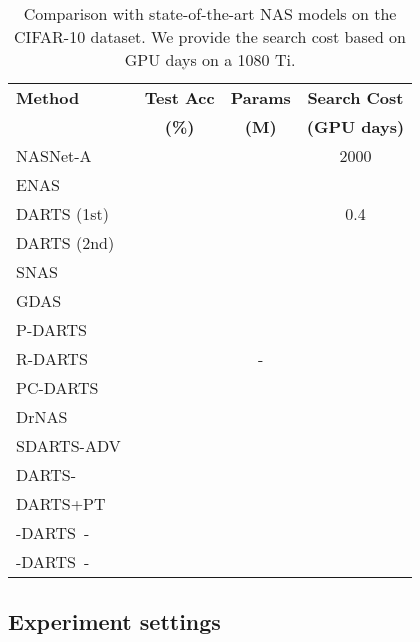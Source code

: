\documentclass{article} \usepackage{fancyhdr, iclr2023_conference, times}
\newcommand{\mydarts}{-DARTS\xspace}
\begin{document}
\begin{table}[t!]
\centering
\caption{Comparison with state-of-the-art NAS models on the CIFAR-10 dataset. We provide the search cost based on GPU days on a 1080 Ti.} 
\label{table:search-cost}
\begin{tabular}{l|c|c|c}
\textbf{Method} & \textbf{Test Acc} & \textbf{Params} & \textbf{Search Cost}\\
&  \textbf{(\%)} & \textbf{(M)} & \textbf{(GPU days)} \\\hline
    NASNet-A~\citep{DBLP:conf/cvpr/ZophVSL18} &  &  & 2000 \\
    ENAS~\citep{DBLP:conf/icml/PhamGZLD18} &  &  &  \\
    DARTS (1st)~\citep{DBLP:conf/iclr/LiuSY19} &  &  & 0.4 \\
    DARTS (2nd)~\citep{DBLP:conf/iclr/LiuSY19} &   &  &  \\
    SNAS~\citep{DBLP:conf/iclr/XieZLL19} &  &   &  \\
    GDAS~\citep{DBLP:conf/cvpr/DongY19} &  &  &  \\
    P-DARTS~\citep{DBLP:conf/eccv/LiuZNSHLFYHM18} &  &  &  \\
    R-DARTS~\citep{DBLP:conf/iclr/ZelaESMBH20} &  & - &  \\
    PC-DARTS~\citep{DBLP:conf/iclr/XuX0CQ0X20} &  &  &  \\
    DrNAS~\citep{DBLP:conf/iclr/ChenWCTH21} &  &  &  \\
    SDARTS-ADV~\citep{DBLP:conf/icml/ChenH20} &  &  &  \\
    DARTS-~\citep{DBLP:conf/iclr/ChuW0LWY21} &  &  &  \\
    DARTS+PT~\citep{DBLP:conf/iclr/WangCCTH21} &  &  &  \\
    
    \hline
    \mydarts~-~ &  &  &  \\
    \mydarts~-~ &  &  & \\
\end{tabular}
\end{table}
\subsection{Experiment settings}
\label{appndx:exp-setting}
\end{document}

